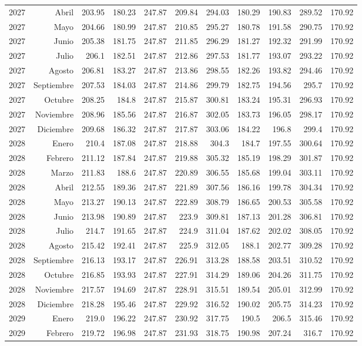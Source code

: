 \documentclass{article}%
\begin{document}
\begin{longtable}{|l r|r|r|r|r|r|r|r|r|r|}
2027&Abril&203.95&180.23&247.87&209.84&294.03&180.29&190.83&289.52&170.92\\%
2027&Mayo&204.66&180.99&247.87&210.85&295.27&180.78&191.58&290.75&170.92\\%
2027&Junio&205.38&181.75&247.87&211.85&296.29&181.27&192.32&291.99&170.92\\%
2027&Julio&206.1&182.51&247.87&212.86&297.53&181.77&193.07&293.22&170.92\\%
2027&Agosto&206.81&183.27&247.87&213.86&298.55&182.26&193.82&294.46&170.92\\%
2027&Septiembre&207.53&184.03&247.87&214.86&299.79&182.75&194.56&295.7&170.92\\%
2027&Octubre&208.25&184.8&247.87&215.87&300.81&183.24&195.31&296.93&170.92\\%
2027&Noviembre&208.96&185.56&247.87&216.87&302.05&183.73&196.05&298.17&170.92\\%
2027&Diciembre&209.68&186.32&247.87&217.87&303.06&184.22&196.8&299.4&170.92\\%
2028&Enero&210.4&187.08&247.87&218.88&304.3&184.7&197.55&300.64&170.92\\%
2028&Febrero&211.12&187.84&247.87&219.88&305.32&185.19&198.29&301.87&170.92\\%
2028&Marzo&211.83&188.6&247.87&220.89&306.55&185.68&199.04&303.11&170.92\\%
2028&Abril&212.55&189.36&247.87&221.89&307.56&186.16&199.78&304.34&170.92\\%
2028&Mayo&213.27&190.13&247.87&222.89&308.79&186.65&200.53&305.58&170.92\\%
2028&Junio&213.98&190.89&247.87&223.9&309.81&187.13&201.28&306.81&170.92\\%
2028&Julio&214.7&191.65&247.87&224.9&311.04&187.62&202.02&308.05&170.92\\%
2028&Agosto&215.42&192.41&247.87&225.9&312.05&188.1&202.77&309.28&170.92\\%
2028&Septiembre&216.13&193.17&247.87&226.91&313.28&188.58&203.51&310.52&170.92\\%
2028&Octubre&216.85&193.93&247.87&227.91&314.29&189.06&204.26&311.75&170.92\\%
2028&Noviembre&217.57&194.69&247.87&228.91&315.51&189.54&205.01&312.99&170.92\\%
2028&Diciembre&218.28&195.46&247.87&229.92&316.52&190.02&205.75&314.23&170.92\\%
2029&Enero&219.0&196.22&247.87&230.92&317.75&190.5&206.5&315.46&170.92\\%
2029&Febrero&219.72&196.98&247.87&231.93&318.75&190.98&207.24&316.7&170.92\\%

\end{longtable}
\end{document}
